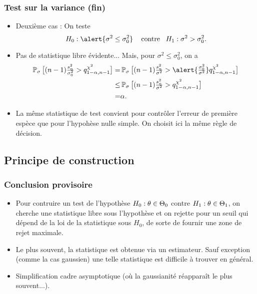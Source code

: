 \begin{frame}
\frametitle{Test sur la variance (fin)}
\begin{itemize}
\item \alert{Deuxième cas :} On teste
$$H_0: \alert{ \sigma^2 \leq \sigma_0^2}\;\;\;\text{ contre}\;\;\; H_1:\sigma^2 > \sigma_0^2.$$
\item \alert{Pas de statistique libre évidente...} Mais, pour $\sigma^2 \leq \sigma_0^2$, on a
\begin{align*}
\PP_{\sigma}\big[(n-1)\tfrac{s_n^2}{\sigma_0^2} > q_{1-\alpha,n-1}^{\chi^2}\big]
= & \PP_{\sigma}\big[(n-1)\tfrac{s_n^2}{\sigma^2} > \alert{\tfrac{\sigma_0^2}{\sigma^2} } q_{1-\alpha,n-1}^{\chi^2}\big] \\
\leq &  \PP_{\sigma}\big[(n-1)\tfrac{s_n^2}{\sigma^2} > q_{1-\alpha,n-1}^{\chi^2}\big] \\
= & \alpha.
\end{align*}
\item La même statistique de test convient pour contrôler l'erreur de première espèce que pour l'hypohèse nulle simple. On choisit \alert{ ici} la \alert{même} règle de décision.
\end{itemize}
\end{frame}

\subsection{Principe de construction}

\begin{frame}
\frametitle{Conclusion provisoire}
\begin{itemize}
\item Pour contruire un test de l'hypothèse $H_0:\theta \in \Theta_0$ contre $H_1:\theta \in \Theta_1$, on cherche \alert{une statistique libre} sous l'hypothèse et on rejette pour un seuil qui dépend de la loi de la statistique sous $H_0$, de sorte de fournir une zone de rejet \alert{ maximale}.
 \item Le plus souvent, la statistique est obtenue via un estimateur. Sauf exception (comme la cas gaussien) une telle statistique est difficile à trouver en général.
 \item \alert{Simplification} cadre asymptotique (où la gaussianité réapparaît le plus souvent...).
\end{itemize}

\end{frame}

